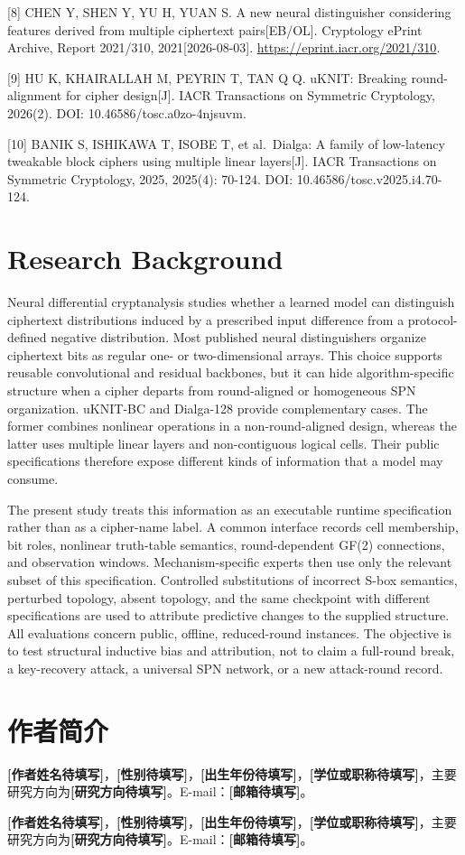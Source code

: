 \documentclass{templates/cjc-utf8}
\newcommand{\placeholder}[1]{\textbf{[#1待填写]}}
\begin{document}
{[}8{]} CHEN Y, SHEN Y, YU H, YUAN S. A new neural distinguisher
considering features derived from multiple ciphertext pairs{[}EB/OL{]}.
Cryptology ePrint Archive, Report 2021/310, 2021{[}2026-08-03{]}.
\url{https://eprint.iacr.org/2021/310}.

{[}9{]} HU K, KHAIRALLAH M, PEYRIN T, TAN Q Q. uKNIT: Breaking
round-alignment for cipher design{[}J{]}. IACR Transactions on Symmetric
Cryptology, 2026(2). DOI: 10.46586/tosc.a0zo-4njsuvm.

{[}10{]} BANIK S, ISHIKAWA T, ISOBE T, et al.~Dialga: A family of
low-latency tweakable block ciphers using multiple linear layers{[}J{]}.
IACR Transactions on Symmetric Cryptology, 2025, 2025(4): 70-124. DOI:
10.46586/tosc.v2025.i4.70-124.

\section{Research Background}

Neural differential cryptanalysis studies whether a learned model can distinguish ciphertext distributions induced by a prescribed input difference from a protocol-defined negative distribution. Most published neural distinguishers organize ciphertext bits as regular one- or two-dimensional arrays. This choice supports reusable convolutional and residual backbones, but it can hide algorithm-specific structure when a cipher departs from round-aligned or homogeneous SPN organization. uKNIT-BC and Dialga-128 provide complementary cases. The former combines nonlinear operations in a non-round-aligned design, whereas the latter uses multiple linear layers and non-contiguous logical cells. Their public specifications therefore expose different kinds of information that a model may consume.

The present study treats this information as an executable runtime specification rather than as a cipher-name label. A common interface records cell membership, bit roles, nonlinear truth-table semantics, round-dependent GF(2) connections, and observation windows. Mechanism-specific experts then use only the relevant subset of this specification. Controlled substitutions of incorrect S-box semantics, perturbed topology, absent topology, and the same checkpoint with different specifications are used to attribute predictive changes to the supplied structure. All evaluations concern public, offline, reduced-round instances. The objective is to test structural inductive bias and attribution, not to claim a full-round break, a key-recovery attack, a universal SPN network, or a new attack-round record.

\section{作者简介}

\noindent\placeholder{作者姓名}，\placeholder{性别}，\placeholder{出生年份}，\placeholder{学位或职称}，主要研究方向为\placeholder{研究方向}。E-mail：\placeholder{邮箱}。

\noindent\placeholder{作者姓名}，\placeholder{性别}，\placeholder{出生年份}，\placeholder{学位或职称}，主要研究方向为\placeholder{研究方向}。E-mail：\placeholder{邮箱}。
\end{document}
